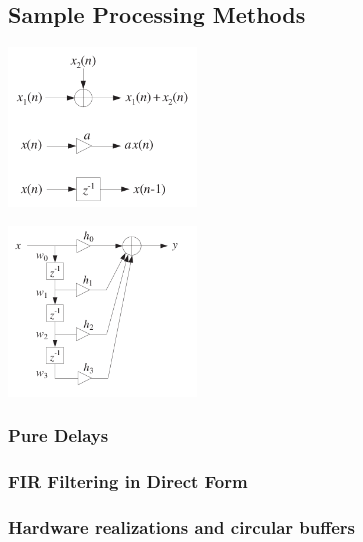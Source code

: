\subsection{Sample Processing Methods}
  \begin{multicols}{2}
    \includegraphics[width=5cm]{./picture/basic_blocks}
    
  \columnbreak
  
    \includegraphics[width=5cm]{./picture/bd_internal_states}
  \end{multicols}
\subsubsection{Pure Delays}
\subsubsection{FIR Filtering in Direct Form}
\subsubsection{Hardware realizations and circular buffers }